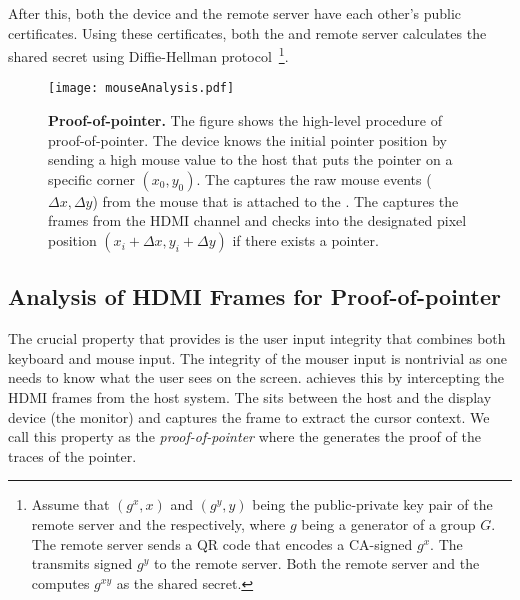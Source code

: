 After this, both the device and the remote server have each other's public certificates. Using these certificates, both the \device and remote server calculates the shared secret using Diffie-Hellman protocol~\footnote{Assume that $(g^x, x)$ and $(g^y, y)$ being the public-private key pair of the remote server and the \device respectively, where $g$ being a generator of a group $G$. The remote server sends a QR code that encodes a CA-signed $g^x$. The \device transmits signed $g^y$ to the remote server. Both the remote server and the \device computes $g^{xy}$ as the shared secret.}.



\begin{figure}[t]
\centering
\texttt{[image: mouseAnalysis.pdf]}
\caption{\textbf{Proof-of-pointer.} The figure shows the high-level procedure of proof-of-pointer. The device knows the initial pointer position by sending a high mouse value to the host that puts the pointer on a specific corner $(x_0, y_0)$. \one The \device captures the raw mouse events ($\Delta x, \Delta y$) from the mouse that is attached to the \device. \two The \device captures the frames from the HDMI channel and checks into the designated pixel position $(x_i + \Delta x, y_i + \Delta y)$ if there exists a pointer.}
\label{fig:mouseAnalysis}
\centering
\end{figure}



\subsection{Analysis of HDMI Frames for Proof-of-pointer}
\label{sec:systemDesign:analysis}

The crucial property that \name provides is the user input integrity that combines both keyboard and mouse input. The integrity of the mouser input is nontrivial as one needs to know what the user sees on the screen. \name achieves this by intercepting the HDMI frames from the host system. The \device sits between the host and the display device (the monitor) and captures the frame to extract the cursor context. We call this property as the \emph{proof-of-pointer} where the \device generates the proof of the traces of the pointer. 

